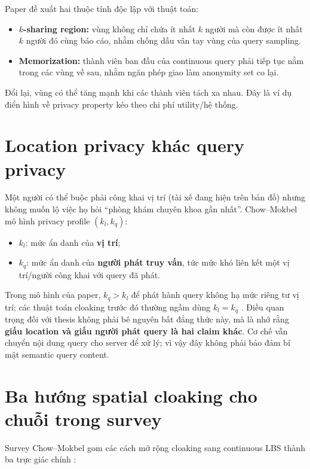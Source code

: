 \documentclass[11pt,a4paper,oneside]{report}
\begin{document}
Paper đề xuất hai thuộc tính độc lập với thuật toán:

\begin{itemize}
  \item \textbf{$k$-sharing region:} vùng không chỉ chứa ít nhất $k$ người mà còn được
  ít nhất $k$ người đó cùng báo cáo, nhằm chống dấu vân tay vùng của query sampling.
  \item \textbf{Memorization:} thành viên ban đầu của continuous query phải tiếp tục
  nằm trong các vùng về sau, nhằm ngăn phép giao làm anonymity set co lại.
\end{itemize}

Đổi lại, vùng có thể tăng mạnh khi các thành viên tách xa nhau. Đây là ví dụ điển
hình về privacy property kéo theo chi phí utility/hệ thống.

\section{Location privacy khác query privacy}

Một người có thể buộc phải công khai vị trí (tài xế đang hiện trên bản đồ) nhưng
không muốn lộ việc họ hỏi ``phòng khám chuyên khoa gần nhất''. Chow--Mokbel mô
hình privacy profile $(k_l,k_q)$:

\begin{itemize}
  \item $k_l$: mức ẩn danh của \textbf{vị trí};
  \item $k_q$: mức ẩn danh của \textbf{người phát truy vấn}, tức mức khó liên kết
  một vị trí/người công khai với query đã phát.
\end{itemize}

Trong mô hình của paper, $k_q>k_l$ để phát hành query không hạ mức riêng tư vị trí;
các thuật toán cloaking trước đó thường ngầm dùng $k_l=k_q$
\cite{chow2007continuous}. Điều quan trọng đối với thesis không phải bê nguyên bất
đẳng thức này, mà là nhớ rằng \textbf{giấu location và giấu người phát query là hai
claim khác}. Cơ chế vẫn chuyển nội dung query cho server để xử lý; vì vậy đây không
phải bảo đảm bí mật semantic query content.

\section{Ba hướng spatial cloaking cho chuỗi trong survey}

Survey Chow--Mokbel gom các cách mở rộng cloaking sang continuous LBS thành ba
trực giác chính \cite{chow2011trajectory}:
\end{document}
